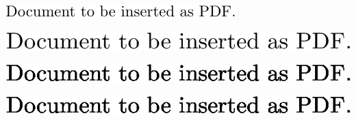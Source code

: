 \documentclass{scrartcl}
\begin{document}
      \includegraphics{pic/img}

      \includegraphics{pic/img2}

      \includegraphics{pic/img3}

      \includegraphics{pic/img4}
    
\end{document}
